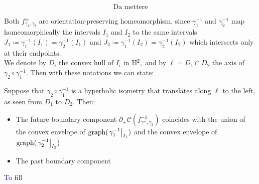 \begin{equation}
    \text{Da mettere}
\end{equation}

Both $f_{\gamma_1,\gamma_2}^{\pm}$ are orientation-preserving homeomorphism, since $\gamma_1^{-1}$ and $\gamma_2^{-1}$ map homeomorphically the intervals $I_1$ and $I_2$ to the same intervals $J_1\coloneqq\gamma_1^{-1}(I_1)=\gamma_2^{-1}(I_1)$ and $J_2\coloneqq\gamma_1^{-1}(I_2)=\gamma_2^{-1}(I_2)$ which intersects only at their endpoints. \\
We denote by $D_i$ the convex hull of $I_i$ in $\mathbb{H}^2,$ and by $\ell=D_1\cap D_2$ the axis of $\gamma_2\circ\gamma_1^{-1}$. Then with these notations we can state: 

\begin{proposition}\label{gettinthere}
    Suppose that $\gamma_2\circ\gamma_1^{-1}$ is a hyperbolic isometry that translates along $\ell$ to the left, as seen from $D_1$ to $D_2$. Then:
    \begin{itemize}
        \item The future boundary component $\partial_+\mathcal{C}(f_{\gamma^+,\gamma_2}^{-1})$ coincides with the union of the convex envelope of $\text{graph}(\left.\gamma_1^{-1}\right|_{I_1})$ and the convex envelope of $\text{graph}(\left.\gamma_2^{-1}\right|_{I_2})$
        \item The past boundary component 
    \end{itemize}
    \textcolor{blue}{To fill}
\end{proposition}
